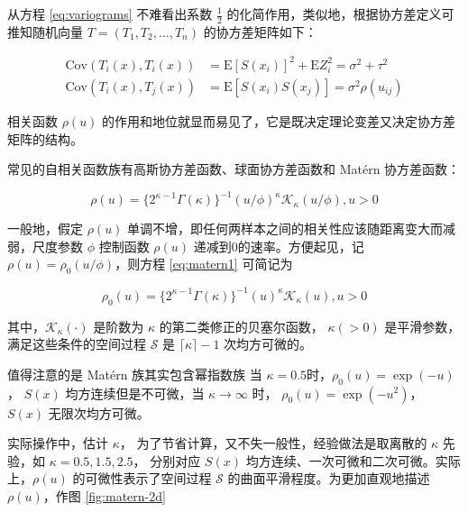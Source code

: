\documentclass[12pt,a4paper,UTF8,twoside]{book}
\theoremstyle{definition}
\theoremstyle{definition}
\theoremstyle{definition}
\theoremstyle{remark}
\begin{document}
\noindent 从方程 \eqref{eq:variograms} 不难看出系数 \(\frac{1}{2}\)
的化简作用，类似地，根据协方差定义可推知随机向量
\(T = (T_1,T_2,\ldots,T_n)\) 的协方差矩阵如下：

\begin{equation}
\begin{aligned}
\mathrm{Cov}(T_{i}(x),T_{i}(x)) &= \mathrm{E}[S(x_i)]^2 + \mathrm{E}Z_{i}^{2}= \sigma^2+\tau^2 \\
\mathrm{Cov}(T_{i}(x),T_{j}(x)) &= \mathrm{E}[S(x_i)S(x_j)]  = \sigma^2\rho(u_{ij})
\end{aligned}
\end{equation}

\noindent 相关函数 \(\rho(u)\)
的作用和地位就显而易见了，它是既决定理论变差又决定协方差矩阵的结构。

常见的自相关函数族有高斯协方差函数、球面协方差函数和 Matérn 协方差函数：

\begin{equation}
\rho(u)=\{2^{\kappa -1}\Gamma(\kappa)\}^{-1}(u/\phi)^{\kappa}\mathcal{K}_{\kappa}(u/\phi),u > 0 \label{eq:matern1}
\end{equation}

\noindent 一般地，假定 \(\rho(u)\)
单调不增，即任何两样本之间的相关性应该随距离变大而减弱，尺度参数
\(\phi\) 控制函数 \(\rho(u)\) 递减到0的速率。方便起见，记
\(\rho(u) = \rho_{0}(u/\phi)\)，则方程 \eqref{eq:matern1} 可简记为

\begin{equation}
\rho_{0}(u)=\{2^{\kappa -1}\Gamma(\kappa)\}^{-1}(u)^{\kappa}\mathcal{K}_{\kappa}(u),u > 0 \label{eq:matern2}
\end{equation}

\noindent 其中，\(\mathcal{K}_{\kappa}(\cdot)\) 是阶数为 \(\kappa\)
的第二类修正的贝塞尔函数， \(\kappa(>0)\)
是平滑参数，满足这些条件的空间过程 \(\mathcal{S}\) 是
\(\lceil\kappa\rceil-1\) 次均方可微的。

值得注意的是 Matérn 族其实包含幂指数族 \noindent 当
\(\kappa = 0.5\)时，\(\rho_{0}(u) = \exp(-u)\)， \(S(x)\)
均方连续但是不可微，当 \(\kappa \to \infty\) 时，
\(\rho_{0}(u) = \exp(-u^2)\)， \(S(x)\) 无限次均方可微。

实际操作中，估计 \(\kappa\)，
为了节省计算，又不失一般性，经验做法是取离散的 \(\kappa\) 先验，如
\(\kappa = 0.5, 1.5, 2.5\)， 分别对应 \(S(x)\)
均方连续、一次可微和二次可微。实际上，\(\rho(u)\) 的可微性表示了空间过程
\(\mathcal{S}\) 的曲面平滑程度。为更加直观地描述 \(\rho(u)\)，作图
\ref{fig:matern-2d}
\end{document}
